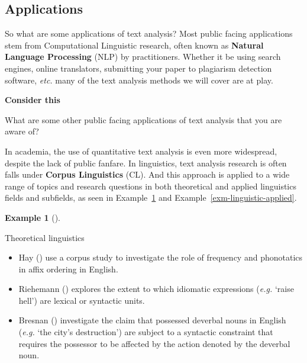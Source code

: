 \documentclass[
  letterpaper,
]{latex/krantz}
\providecommand{\tightlist}{%
  \setlength{\itemsep}{0pt}\setlength{\parskip}{0pt}}\usepackage{longtable,booktabs,array}
\theoremstyle{definition}
\newtheorem{example}{Example}[chapter]
\theoremstyle{remark}
\begin{document}
\subsection{Applications}\label{applications}

So what are some applications of text analysis? Most public facing
applications stem from Computational Linguistic research, often known as
\textbf{Natural Language Processing} (NLP) by practitioners. Whether it
be using search engines, online translators, submitting your paper to
plagiarism detection software, \emph{etc.} many of the text analysis
methods we will cover are at play.

\begin{tcolorbox}[enhanced jigsaw, breakable, leftrule=.75mm, arc=.35mm, colframe=quarto-callout-color-frame, colback=white, left=2mm, bottomrule=.15mm, rightrule=.15mm, toprule=.15mm, opacityback=0]

\textbf{ Consider this}

What are some other public facing applications of text analysis that you
are aware of?

\end{tcolorbox}

In academia, the use of quantitative text analysis is even more
widespread, despite the lack of public fanfare. In linguistics, text
analysis research is often falls under
\textbf{Corpus Linguistics} (CL). And this
approach is applied to a wide range of topics and research questions in
both theoretical and applied linguistics fields and subfields, as seen
in Example~\ref{exm-linguistic-theory} and
Example~\ref{exm-linguistic-applied}.

\begin{example}[]\protect\hypertarget{exm-linguistic-theory}{}\label{exm-linguistic-theory}

Theoretical linguistics

\begin{itemize}
\tightlist
\item
  Hay () use a corpus study to investigate
  the role of frequency and phonotatics in affix ordering in English.
\item
  Riehemann () explores the extent to
  which idiomatic expressions (\emph{e.g.} `raise hell') are lexical or
  syntactic units.
\item
  Bresnan () investigate the claim that
  possessed deverbal nouns in English (\emph{e.g.} `the city's
  destruction') are subject to a syntactic constraint that requires the
  possessor to be affected by the action denoted by the deverbal noun.
\end{itemize}

\end{example}
\end{document}

